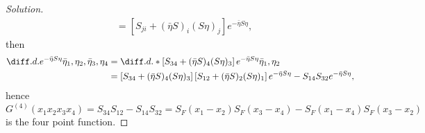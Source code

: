 \begin{proof}[Solution]
\begin{align*}
      &= \left[S_{ji} + (\bar{\eta} S)_i (S \eta)_j\right]e^{- \bar{\eta} S \eta},
   \end{align*}
   then
   \begin{align*}
      \diff.d.{e^{- \bar{\eta} S \eta}}{\bar{\eta}_1,\eta_2,\bar{\eta}_3,\eta_4} 
      &= \diff.d.*{\left[S_{34}  + (\bar{\eta} S)_4 (S \eta)_3\right]e^{- \bar{\eta} S \eta}}{\bar{\eta}_1,\eta_2}\\
      &= \left[S_{34}  + (\bar{\eta} S)_4 (S \eta)_3\right]\left[S_{12}  + (\bar{\eta} S)_2 (S \eta)_1\right]e^{- \bar{\eta} S \eta} - S_{14} S_{32} e^{- \bar{\eta} S \eta},
   \end{align*}
   hence
   \begin{equation*}
      G^{(4)}(x_1 x_2 x_3 x_4) = S_{34} S_{12} - S_{14} S_{32} = S_F(x_1 - x_2) S_F(x_3 - x_4) - S_F(x_1 - x_4) S_F(x_3 - x_2)
   \end{equation*}
   is the four point function.
\end{proof}
